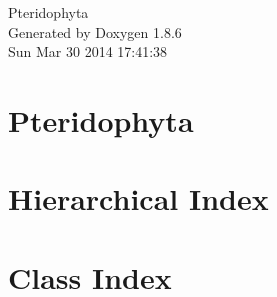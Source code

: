 \documentclass[twoside]{book}
\newcommand{\clearemptydoublepage}{%
  \newpage{\pagestyle{empty}\cleardoublepage}%
}
\begin{document}
\hypersetup{pageanchor=false}
\begin{titlepage}
\vspace*{7cm}
\begin{center}%
{\Large Pteridophyta }\\
\vspace*{1cm}
{\large Generated by Doxygen 1.8.6}\\
\vspace*{0.5cm}
{\small Sun Mar 30 2014 17:41:38}\\
\end{center}
\end{titlepage}
\clearemptydoublepage
\tableofcontents
\clearemptydoublepage
{}
\hypersetup{pageanchor=true}

\chapter{Pteridophyta}
\label{md__r_e_a_d_m_e}
\hypertarget{md__r_e_a_d_m_e}{}

\chapter{Hierarchical Index}

\chapter{Class Index}

\end{document}
